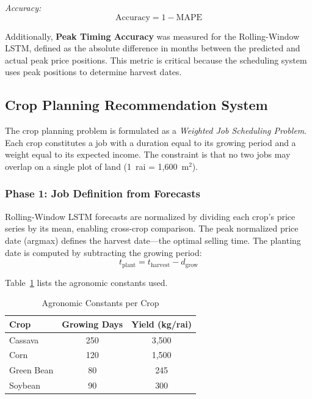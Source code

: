 \documentclass[conference]{IEEEtran}
\begin{document}
\textit{Accuracy:}
\begin{equation}
  \text{Accuracy} = 1 - \text{MAPE}
\end{equation}

Additionally, \textbf{Peak Timing Accuracy} was measured for the Rolling-Window LSTM, defined as the absolute difference in months between the predicted and actual peak price positions. This metric is critical because the scheduling system uses peak positions to determine harvest dates.

\subsection{Crop Planning Recommendation System}

The crop planning problem is formulated as a \textit{Weighted Job Scheduling Problem}. Each crop constitutes a job with a duration equal to its growing period and a weight equal to its expected income. The constraint is that no two jobs may overlap on a single plot of land (1~rai = 1,600~m$^2$).

\subsubsection{Phase 1: Job Definition from Forecasts}

Rolling-Window LSTM forecasts are normalized by dividing each crop's price series by its mean, enabling cross-crop comparison. The peak normalized price date (argmax) defines the harvest date---the optimal selling time. The planting date is computed by subtracting the growing period:
\begin{equation}
  t_{\text{plant}} = t_{\text{harvest}} - d_{\text{grow}}
\end{equation}

Table~\ref{tab:agro} lists the agronomic constants used.

\begin{table}[htbp]
  \centering
  \caption{Agronomic Constants per Crop}
  \label{tab:agro}
  \begin{tabular}{lcc}
    \toprule
    \textbf{Crop} & \textbf{Growing Days} & \textbf{Yield (kg/rai)} \\
    \midrule
    Cassava & 250 & 3,500 \\
    Corn & 120 & 1,500 \\
    Green Bean & 80 & 245 \\
    Soybean & 90 & 300 \\
    \bottomrule
  \end{tabular}
\end{table}
\end{document}
